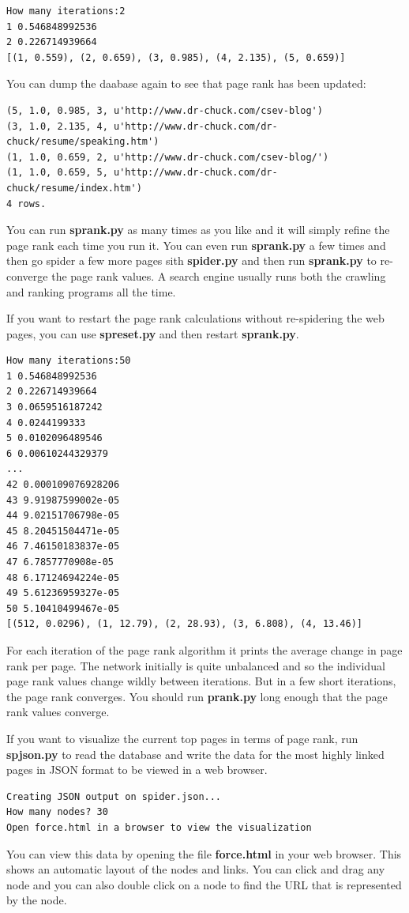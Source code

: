 \documentclass[11pt]{book}
\begin{document}
\beforeverb
\begin{verbatim}
How many iterations:2
1 0.546848992536
2 0.226714939664
[(1, 0.559), (2, 0.659), (3, 0.985), (4, 2.135), (5, 0.659)]
\end{verbatim}
\afterverb
%
You can dump the daabase again to see that page rank has been updated:

\beforeverb
\begin{verbatim}
(5, 1.0, 0.985, 3, u'http://www.dr-chuck.com/csev-blog')
(3, 1.0, 2.135, 4, u'http://www.dr-chuck.com/dr-chuck/resume/speaking.htm')
(1, 1.0, 0.659, 2, u'http://www.dr-chuck.com/csev-blog/')
(1, 1.0, 0.659, 5, u'http://www.dr-chuck.com/dr-chuck/resume/index.htm')
4 rows.
\end{verbatim}
\afterverb
%
You can run {\bf sprank.py} as many times as you like and it will simply refine
the page rank each time you run it.  You can even run {\bf sprank.py} a few times
and then go spider a few more pages sith {\bf spider.py} and then run {\bf sprank.py}
to re-converge the page rank values.  A search engine usually runs both the crawling and 
ranking programs all the time.

If you want to restart the page rank calculations without re-spidering the 
web pages, you can use {\bf spreset.py} and then restart {\bf sprank.py}.

\beforeverb
\begin{verbatim}
How many iterations:50
1 0.546848992536
2 0.226714939664
3 0.0659516187242
4 0.0244199333
5 0.0102096489546
6 0.00610244329379
...
42 0.000109076928206
43 9.91987599002e-05
44 9.02151706798e-05
45 8.20451504471e-05
46 7.46150183837e-05
47 6.7857770908e-05
48 6.17124694224e-05
49 5.61236959327e-05
50 5.10410499467e-05
[(512, 0.0296), (1, 12.79), (2, 28.93), (3, 6.808), (4, 13.46)]
\end{verbatim}
\afterverb
%
For each iteration of the page rank algorithm it prints the average
change in page rank per page.   The network initially is quite
unbalanced and so the individual page rank values change wildly between
iterations.
But in a few short iterations, the page rank converges.  You
should run {\bf prank.py} long enough that the page rank values converge.

If you want to visualize the current top pages in terms of page rank,
run {\bf spjson.py} to read the database and write the data for the 
most highly linked pages in JSON format to be viewed in a
web browser.

\beforeverb
\begin{verbatim}
Creating JSON output on spider.json...
How many nodes? 30
Open force.html in a browser to view the visualization
\end{verbatim}
\afterverb
%
You can view this data by opening the file {\bf force.html} in your web browser.  
This shows an automatic layout of the nodes and links.  You can click and 
drag any node and you can also double click on a node to find the URL
that is represented by the node.
\end{document}
